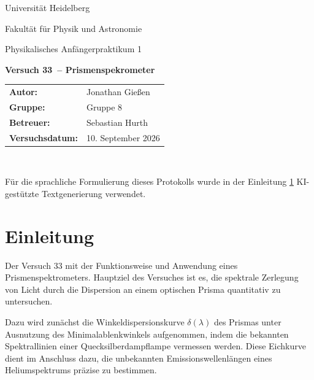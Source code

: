\documentclass[12pt,a4paper,titlepage]{scrartcl}
\numberwithin{equation}{section}
\numberwithin{table}{section}
\numberwithin{figure}{section}
\newcommand{\versuch}{Versuch 33}
\newcommand{\titel}{Prismenspekrometer}
\newcommand{\praktikum}{Physikalisches Anfängerpraktikum 1}
\newcommand{\autor}{Jonathan Gießen}
\newcommand{\gruppe}{Gruppe 8}
\newcommand{\datum}{10. September 2026}
\newcommand{\betreuer}{Sebastian Hurth}
\begin{document}
\pagestyle{scrheadings}

\begin{titlepage}



    \centering
    \vspace*{4cm}
    {\large Universität Heidelberg\par}
    {\small Fakultät für Physik und Astronomie\par}
    {\Large \praktikum\par}
    \vspace{0.8cm}
    {\LARGE \bfseries \versuch\ -- \titel\par}
    \vspace{1.5cm}

    \begin{tabular}{ll}
        \textbf{Autor:} & \autor\\
        \textbf{Gruppe:} & \gruppe\\
        \textbf{Betreuer:} & \betreuer\\
        \textbf{Versuchsdatum:} & \datum\\
    \end{tabular}

    \vfill
    \hrulefill\
\end{titlepage}

\tableofcontents

\bigskip
\begin{tcolorbox}[colback=gray!5,colframe=gray!60,boxrule=0.8pt,arc=0.01mm,title=KI-Hinweis]
    Für die sprachliche Formulierung dieses Protokolls wurde in der Einleitung \ref{sec:Einleitung} KI-gestützte Textgenerierung verwendet.
\end{tcolorbox}

\clearpage
\section{Einleitung}\label{sec:Einleitung}
Der Versuch 33 mit der Funktionsweise und Anwendung eines Prismenspektrometers. Hauptziel des Versuches ist es, die spektrale Zerlegung von Licht durch die Dispersion an einem optischen Prisma quantitativ zu untersuchen. 

Dazu wird zunächst die Winkeldispersionskurve $\delta(\lambda)$ des Prismas unter Ausnutzung des Minimalablenkwinkels aufgenommen, indem die bekannten Spektrallinien einer Quecksilberdampflampe vermessen werden. Diese Eichkurve dient im Anschluss dazu, die unbekannten Emissionswellenlängen eines Heliumspektrums präzise zu bestimmen. 
\end{document}
